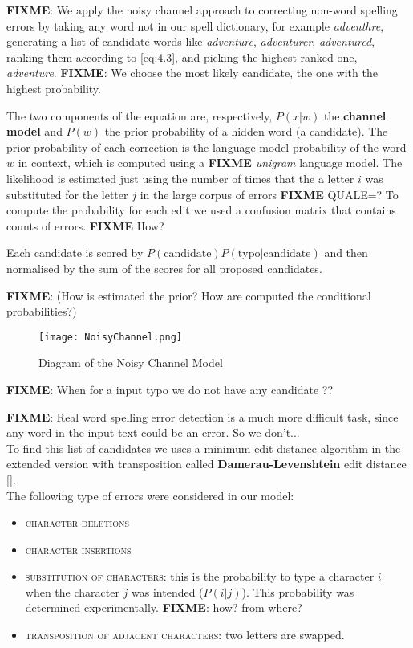 \textbf{FIXME}: We apply the noisy channel approach to correcting non-word spelling errors by taking any word not 
in our 
spell dictionary, for example \textsl{adventhre}, generating a list of candidate words like \textsl{adventure}, 
\textsl{adventurer}, \textsl{adventured}, ranking them according to \ref{eq:4.3}, and picking the highest-ranked 
one, 
\textsl{adventure}. \textbf{FIXME}: We choose the most likely candidate, the one with the highest probability.

The two components of the equation are, respectively, $P(x|w)$ the \textbf{channel model} and $P(w)$ the prior 
probability of a hidden word (a candidate).
The prior probability of each correction is the language model probability of the word $w$ in context, which is 
computed using a \textbf{FIXME} \textit{unigram} language model. 
The likelihood is estimated just using the number of times that the a letter $i$ was substituted for the letter $j$ in 
the large corpus of errors \textbf{FIXME} QUALE=? 
To compute the probability for each edit we used a confusion matrix that contains counts of errors. \textbf{FIXME} 
How? 



Each candidate is scored by $P(\mbox{candidate})P(\mbox{typo}|\mbox{candidate})$ and then normalised by the 
sum of the scores for all proposed candidates.

\textbf{FIXME}:  (How is estimated the prior? How are computed the conditional probabilities?)

\begin{figure}[H]
	\centering
	\texttt{[image: NoisyChannel.png]}
	\caption{Diagram of the Noisy Channel Model}
	\label{fig:noisychannel}
\end{figure}

\textbf{FIXME}: When for a input typo we do not have any candidate ?? 

\textbf{FIXME}: Real word spelling error detection is a much more difficult task, since any word in the input text 
could be 
an error. So we don’t...\\


To find this list of candidates we uses a minimum edit distance algorithm in the extended version with 
transposition called \textbf{Damerau-Levenshtein} edit distance \ref{}.	\\

The following type of errors were considered in our model:
\begin{itemize}
	\item \textsc{character deletions}
	\item \textsc{character insertions}
	\item \textsc{substitution of characters}: this is the probability to type 
	a character $i$ when the character $j$ was 
	intended ($P(i|j)$). This probability was determined experimentally. \textbf{FIXME}: how? from where?
	\item \textsc{transposition of adjacent characters}: two letters are 
	swapped.
\end{itemize}

